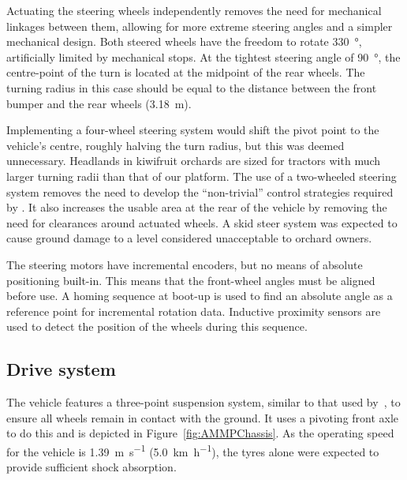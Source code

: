 \documentclass[preprint,authoryear,12pt]{elsarticle}
\begin{document}
        Actuating the steering wheels independently removes the need for mechanical linkages between them, allowing for more extreme steering angles and a simpler mechanical design.
        Both steered wheels have the freedom to rotate \SI{330}{\degree}, artificially limited by mechanical stops.
        At the tightest steering angle of \SI{90}{\degree}, the centre-point of the turn is located at the midpoint of the rear wheels.
        The turning radius in this case should be equal to the distance between the front bumper and the rear wheels (\SI{3.18}{\meter}).

        Implementing a four-wheel steering system would shift the pivot point to the vehicle's centre, roughly halving the turn radius, but this was deemed unnecessary.
        Headlands in kiwifruit orchards are sized for tractors with much larger turning radii than that of our platform.
        The use of a two-wheeled steering system removes the need to develop the ``non-trivial'' control strategies required by \cite{Bak2004}.
        It also increases the usable area at the rear of the vehicle by removing the need for clearances around actuated wheels.
        A skid steer system was expected to cause ground damage to a level considered unacceptable to orchard owners.

        The steering motors have incremental encoders, but no means of absolute positioning built-in.
        This means that the front-wheel angles must be aligned before use.
        A homing sequence at boot-up is used to find an absolute angle as a reference point for incremental rotation data.
        Inductive proximity sensors are used to detect the position of the wheels during this sequence.

    \subsection{Drive system}
    \label{sub:drive}
        The vehicle features a three-point suspension system, similar to that used by~\cite{Bak2004}, to ensure all wheels remain in contact with the ground.
        It uses a pivoting front axle to do this and is depicted in Figure~\ref{fig:AMMPChassis}.
        As the operating speed for the vehicle is \SI{1.39}{\meter\per\second} (\SI{5.0}{\kilo\meter\per\hour}), the tyres alone were expected to provide sufficient shock absorption.
\end{document}
